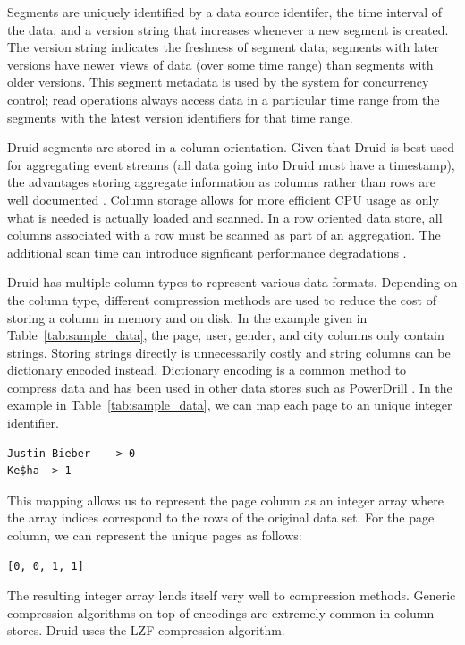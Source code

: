 \documentclass{acm_proc_article-sp}
\begin{document}
Segments are uniquely identified by a data source identifer, the time interval
of the data, and a version string that increases whenever a new segment is
created.  The version string indicates the freshness of segment data; segments
with later versions have newer views of data (over some time range) than
segments with older versions.  This segment metadata is used by the system for
concurrency control; read operations always access data in a particular time
range from the segments with the latest version identifiers for that time
range.

Druid segments are stored in a column orientation. Given that Druid is best
used for aggregating event streams (all data going into Druid must have a
timestamp), the advantages storing aggregate information as columns rather than
rows are well documented \cite{abadi2008column}. Column storage allows for more
efficient CPU usage as only what is needed is actually loaded and scanned. In a
row oriented data store, all columns associated with a row must be scanned as
part of an aggregation. The additional scan time can introduce signficant performance
degradations \cite{abadi2008column}.

Druid has multiple column types to represent various data formats. Depending on
the column type, different compression methods are used to reduce the cost of
storing a column in memory and on disk. In the example given in
Table~\ref{tab:sample_data}, the page, user, gender, and city columns only
contain strings. Storing strings directly is unnecessarily costly and string
columns can be dictionary encoded instead. Dictionary encoding is a common
method to compress data and has been used in other data stores such as
PowerDrill \cite{hall2012processing}. In the example in
Table~\ref{tab:sample_data}, we can map each page to an unique integer
identifier.
\begin{verbatim}
Justin Bieber   -> 0
Ke$ha -> 1
\end{verbatim}
This mapping allows us to represent the page column as an integer
array where the array indices correspond to the rows of the original
data set. For the page column, we can represent the unique
pages as follows:
\begin{verbatim}
[0, 0, 1, 1]
\end{verbatim}

The resulting integer array lends itself very well to
compression methods. Generic compression algorithms on top of encodings are
extremely common in column-stores. Druid uses the LZF \cite{liblzf2013} compression
algorithm.
\end{document}

